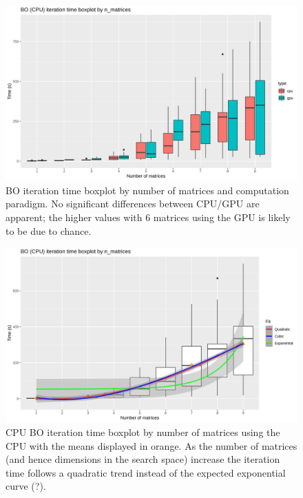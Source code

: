 \begin{figure}[h!]
\centering
\includegraphics[width=\textwidth]{figures/bo_boxplot}
\decoRule
\caption[BO iteration time boxplot]{BO iteration time boxplot by number of matrices and computation paradigm. No significant differences between CPU/GPU are apparent; the higher values with 6 matrices using the GPU is likely to be due to chance.}
\label{fig:bo_boxplot}
\end{figure}

\begin{figure}[h!]
\centering
\includegraphics[width=\textwidth]{figures/bo_boxplot_cpu}
\decoRule
\caption[BO iteration time boxplot (CPU)]{CPU BO iteration time boxplot by number of matrices using the CPU with the means displayed in orange. As the number of matrices (and hence dimensions in the search space) increase the iteration time follows a quadratic trend instead of the expected exponential curve (?).}
\label{fig:bo_boxplot_cpu}
\end{figure}

